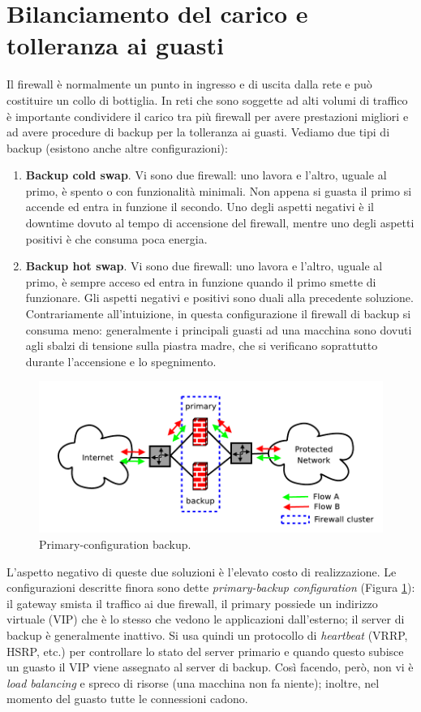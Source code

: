 \section{Bilanciamento del carico e tolleranza ai guasti}
Il firewall è normalmente un punto in ingresso e di uscita dalla rete e può costituire un collo di bottiglia. In reti che sono soggette ad alti volumi di traffico è importante condividere il carico tra più firewall per avere prestazioni migliori e ad avere procedure di backup per la tolleranza ai guasti. Vediamo due tipi di backup (esistono anche altre configurazioni):
\begin{enumerate}
	\item \textbf{Backup cold swap}. Vi sono due firewall: uno lavora e l'altro, uguale al primo, è spento o con funzionalità minimali. Non appena si guasta il primo si accende ed entra in funzione il secondo. Uno degli aspetti negativi è il downtime dovuto al tempo di accensione del firewall, mentre uno degli aspetti positivi è che consuma poca energia.
	\item \textbf{Backup hot swap}. Vi sono due firewall: uno lavora e l'altro, uguale al primo, è sempre acceso ed entra in funzione quando il primo smette di funzionare. Gli aspetti negativi e positivi sono duali alla precedente soluzione. Contrariamente all'intuizione, in questa configurazione il firewall di backup si consuma meno: generalmente i principali guasti ad una macchina sono dovuti agli sbalzi di tensione sulla piastra madre, che si verificano soprattutto durante l'accensione e lo spegnimento.
\end{enumerate}
\begin{figure}[htbp]
	\centering
	\includegraphics[scale = 0.35]{images/primary-configuration-backup}
	\caption{Primary-configuration backup.}
	\label{img:primary-configuration-backup}
\end{figure}
L'aspetto negativo di queste due soluzioni è l'elevato costo di realizzazione. Le configurazioni descritte finora sono dette \textit{primary-backup configuration} (Figura \ref{img:primary-configuration-backup}): il gateway smista il traffico ai due firewall, il primary possiede un indirizzo virtuale (VIP) che è lo stesso che vedono le applicazioni dall'esterno; il server di backup è generalmente inattivo. Si usa quindi un protocollo di \textit{heartbeat} (VRRP, HSRP, etc.) per controllare lo stato del server primario e quando questo subisce un guasto il VIP viene assegnato al server di backup. Così facendo, però, non vi è \textit{load balancing} e spreco di risorse (una macchina non fa niente); inoltre, nel momento del guasto tutte le connessioni cadono.

